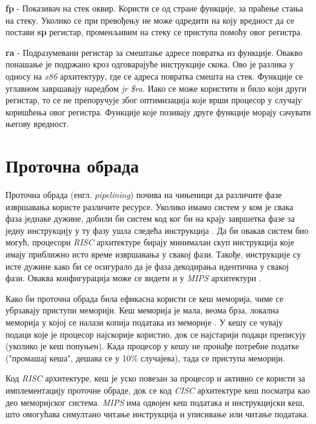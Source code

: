 \documentclass[12pt,oneside]{memoir}
\begin{document}
\textbf{fp} - Показивач на стек оквир. Користи се од стране функције, за праћење стања на стеку. Уколико се при
превођењу не може одредити на коју вредност да се постави \textbf{sp} регистар, променљивим на стеку се приступа
помоћу овог регистра.

\textbf{ra} - Подразумевани регистар за смештање адресе повратка из функције. Овакво понашање је подржано кроз
одговарајуће инструкције скока. Ово је разлика у односу на \textit{x86} архитектуру, где се адреса повратка смешта
на стек. Функције се углавном завршавају наредбом \textit{jr \$ra}. Иако се може користити и било који други
регистар, то се не препоручује због оптимизација које врши процесор у случају коришћења овог регистра. Функције које
позивају друге функције морају сачувати његову вредност.

\section{Проточна обрада} \label{chp:PIPE}

Проточна обрада (енгл. \textit{pipelining}) почива на чињеници да различите фазе извршавања користе различите
ресурсе. Уколико имамо систем у ком је свака фаза једнаке дужине, добили би систем код ког би на крају завршетка
фазе за једну инструкцију у ту фазу ушла следећа инструкција \cite{SMR}. Да би овакав систем био могућ, процесори
\textit{RISC} архитектуре бирају минималан скуп инструкција које имају приближно исто време извршавања у свакој
фази. Такође, инструкције су исте дужине како би се осигурало да је фаза декодирања идентична у свакој фази. Оваква
конфигурација може се видети и у \textit{MIPS} архитектури \cite{SMR}.

Како би проточна обрада била ефикасна користи се кеш меморија, чиме се убрзавају приступи меморији. Кеш меморија је
мала, веома брза, локална меморија у којој се налази копија података из меморије \cite{SMR}. У кешу се чувају подаци
које је процесор најскорије користио, док се најстарији подаци преписују (уколико је кеш попуњен). Када процесор
у кешу не пронађе потребне податке ("промашај кеша", дешава се у 10\% случајева), тада се приступа меморији.

Код \textit{RISC} архитектуре, кеш је уско повезан за процесор и активно се користи за имплементацију проточне
обраде, док се код \textit{CISC} архитектуре кеш посматра као део меморијског система. \textit{MIPS} има одвојен кеш
података и инструкцијски кеш, што омогућава симултано читање инструкција и уписивање или читање података.
\end{document}

